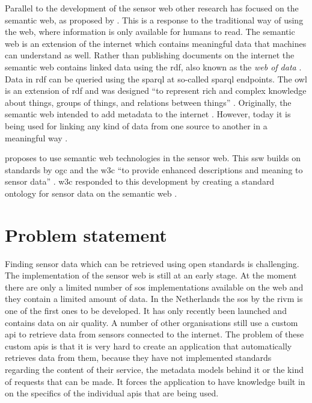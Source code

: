 Parallel to the development of the sensor web other research has focused on the semantic web, as proposed by \cite{LD:Berners-lee}. This is a response to the traditional way of using the web, where information is only available for humans to read. The semantic web is an extension of the internet which contains meaningful data that machines can understand as well. Rather than publishing documents on the internet the semantic web contains linked data using the \ac{rdf}, also known as the \textit{web of data} \citep{LD:Bizer}. Data in \ac{rdf} can be queried using the \ac{sparql} at so-called \ac{sparql} endpoints. The \ac{owl} is an extension of \ac{rdf} and was designed \enquote{to represent rich and complex knowledge about things, groups of things, and relations between things} \citep{LD:OWL}. Originally, the semantic web intended to add metadata to the internet \citep{LD:W3C}. However, today it is being used for linking any kind of data from one source to another in a meaningful way \citep{LD:Cambridge}. 

\cite{SSW:Sheth} proposes to use semantic web technologies in the sensor web. This \ac{ssw} builds on standards by \ac{ogc} and the \ac{w3c} \enquote{to provide enhanced descriptions and meaning to sensor data} \cite[p. 78]{SSW:Sheth}. \ac{w3c} responded to this development by creating a standard ontology for sensor data on the semantic web \citep{SSW:SSN_incubatorGroup}. 

\section{Problem statement}
Finding sensor data which can be retrieved using open standards is challenging. The implementation of the sensor web is still at an early stage. At the moment there are only a limited number of \ac{sos} implementations available on the web and they contain a limited amount of data. In the Netherlands the \ac{sos} by the \ac{rivm} is one of the first ones to be developed. It has only recently been launched and contains data on air quality. A number of other organisations still use a custom \ac{api} to retrieve data from sensors connected to the internet. The problem of these custom \ac{api}s is that it is very hard to create an application that automatically retrieves data from them, because they have not implemented standards regarding the content of their service, the metadata models behind it or the kind of requests that can be made. It forces the application to have knowledge built in on the specifics of the individual \ac{api}s that are being used.  

